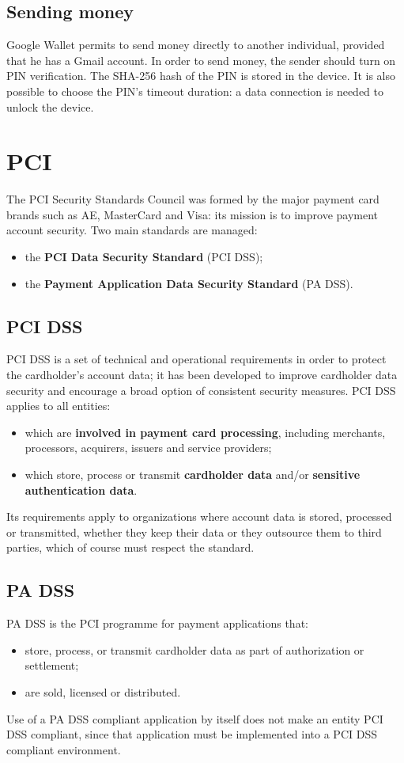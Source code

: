 \documentclass[a4paper, 10pt, titlepage]{article}
\begin{document}
\subsection{Sending money}
Google Wallet permits to send money directly to another individual, provided that he has a Gmail account. In order to send money, the sender should turn on PIN verification. The SHA-256 hash of the PIN is stored in the device. It is also possible to choose the PIN's timeout duration: a data connection is needed to unlock the device.

\section{PCI}
The PCI Security Standards Council was formed by the major payment card brands such as AE, MasterCard and Visa: its mission is to improve payment account security. Two main standards are managed:
\begin{itemize}
\item the \textbf{PCI Data Security Standard} (PCI DSS);
\item the \textbf{Payment Application Data Security Standard} (PA DSS).
\end{itemize}

\subsection{PCI DSS}
PCI DSS is a set of technical and operational requirements in order to protect the cardholder's account data; it has been developed to improve cardholder data security and encourage a broad option of consistent security measures. PCI DSS applies to all entities:
\begin{itemize}
\item which are \textbf{involved in payment card processing}, including merchants, processors, acquirers, issuers and service providers;
\item which store, process or transmit \textbf{cardholder data} and/or \textbf{sensitive authentication data}.
\end{itemize}
Its requirements apply to organizations where account data is stored, processed or transmitted, whether they keep their data or they outsource them to third parties, which of course must respect the standard.

\subsection{PA DSS}
PA DSS is the PCI programme for payment applications that:
\begin{itemize}
\item store, process, or transmit cardholder data as part of authorization or settlement;
\item are sold, licensed or distributed.
\end{itemize} 
Use of a PA DSS compliant application by itself does not make an entity PCI DSS compliant, since that application must be implemented into a PCI DSS compliant environment.
\end{document}
